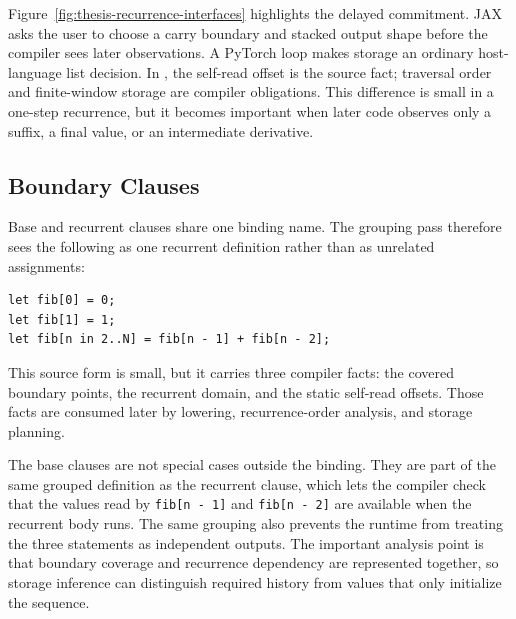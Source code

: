 \begin{center}
\centering

\captionsetup{type=figure,hypcap=false}
\caption{Thesis-adapted comparison of recurrence interfaces. The thesis copy
emphasizes which scheduling and storage decisions are source obligations in
neighboring systems and which are compiler obligations in \einlang{}.}
\label{fig:thesis-recurrence-interfaces}
\end{center}

Figure~\ref{fig:thesis-recurrence-interfaces} highlights the delayed
commitment. JAX asks the user to choose a carry boundary and stacked output
shape before the compiler sees later observations. A PyTorch loop makes storage
an ordinary host-language list decision. In \einlang{}, the self-read offset is
the source fact; traversal order and finite-window storage are compiler
obligations. This difference is small in a one-step recurrence, but it becomes
important when later code observes only a suffix, a final value, or an
intermediate derivative.

\subsection{Boundary Clauses}

Base and recurrent clauses share one binding name. The grouping pass therefore
sees the following as one recurrent definition rather than as unrelated
assignments:

\begin{lstlisting}[style=einlang]
let fib[0] = 0;
let fib[1] = 1;
let fib[n in 2..N] = fib[n - 1] + fib[n - 2];
\end{lstlisting}

This source form is small, but it carries three compiler facts: the covered
boundary points, the recurrent domain, and the static self-read offsets. Those
facts are consumed later by lowering, recurrence-order analysis, and storage
planning.

The base clauses are not special cases outside the binding. They are part of
the same grouped definition as the recurrent clause, which lets the compiler
check that the values read by \texttt{fib[n - 1]} and \texttt{fib[n - 2]} are
available when the recurrent body runs. The same grouping also prevents the
runtime from treating the three statements as independent outputs. The
important analysis point is that boundary coverage and recurrence dependency
are represented together, so storage inference can distinguish required
history from values that only initialize the sequence.

